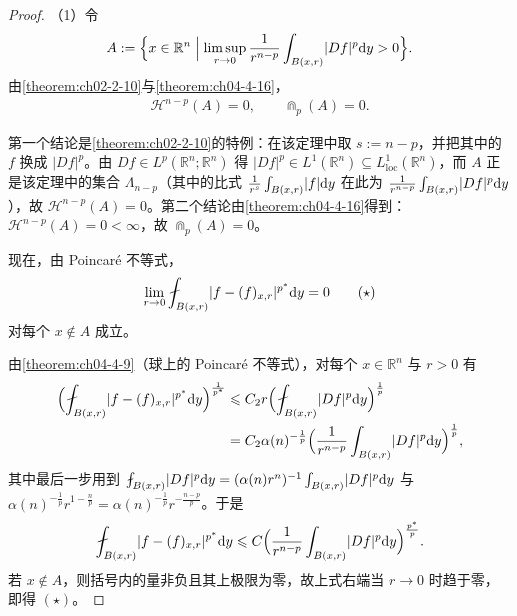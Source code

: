 \documentclass[../../main.tex]{subfiles}%
\begin{document}
\begin{proof}
（1）令
\begin{align*}
A:=\Bigl\{x\in\mathbb{R}^n\Bigm|\limsup_{r\to0}\frac{1}{r^{n-p}}\int_{B(x,r)}\lvert Df\rvert^p\mathrm{d} y>0\Bigr\} .
\end{align*}
由\cref{theorem:ch02-2-10}与\cref{theorem:ch04-4-16}，%
\begin{align*}
\mathcal{H}^{n-p}(A)=0,\qquad\Cap_p(A)=0 .
\end{align*}

第一个结论是\cref{theorem:ch02-2-10}的特例：在该定理中取 $s:=n-p$，并把其中的 $f$ 换成 $\lvert Df\rvert^p$。由 $Df\in L^p(\mathbb{R}^n;\mathbb{R}^n)$ 得 $\lvert Df\rvert^p\in L^1(\mathbb{R}^n)\subseteq L^1_{\mathrm{loc}}(\mathbb{R}^n)$，而 $A$ 正是该定理中的集合 $\Lambda_{n-p}$（其中的比式 $\frac{1}{r^s}\int_{B(x,r)}\lvert f\rvert\mathrm{d} y$ 在此为 $\frac{1}{r^{n-p}}\int_{B(x,r)}\lvert Df\rvert^p\mathrm{d} y$），故 $\mathcal{H}^{n-p}(A)=0$。第二个结论由\cref{theorem:ch04-4-16}得到：$\mathcal{H}^{n-p}(A)=0<\infty$，故 $\Cap_p(A)=0$。%

现在，由 Poincaré 不等式，
\begin{align*}
\lim_{r\to0}\fint_{B(x,r)}\lvert f-(f)_{x,r}\rvert^{p^*}\diff y=0\qquad(\star)
\end{align*}
对每个 $x\notin A$ 成立。

由\cref{theorem:ch04-4-9}（球上的 Poincaré 不等式），对每个 $x\in\mathbb{R}^n$ 与 $r>0$ 有 %
\begin{align*}
\Bigl(\fint_{B(x,r)}\lvert f-(f)_{x,r}\rvert^{p^*}\diff y\Bigr)^{\frac{1}{p^*}}
&\leqslant C_2r\Bigl(\fint_{B(x,r)}\lvert Df\rvert^p\diff y\Bigr)^{\frac{1}{p}}\\
&=C_2\alpha(n)^{-\frac{1}{p}}\Bigl(\frac{1}{r^{n-p}}\int_{B(x,r)}\lvert Df\rvert^p\diff y\Bigr)^{\frac{1}{p}} ,%
\end{align*}
其中最后一步用到 $\fint_{B(x,r)}\lvert Df\rvert^p\diff y=(\alpha(n)r^n)^{-1}\int_{B(x,r)}\lvert Df\rvert^p\diff y$ 与 $\alpha(n)^{-\frac{1}{p}}r^{1-\frac{n}{p}}=\alpha(n)^{-\frac{1}{p}}r^{-\frac{n-p}{p}}$。于是
\begin{align*}
\fint_{B(x,r)}\lvert f-(f)_{x,r}\rvert^{p^*}\diff y\leqslant C\Bigl(\frac{1}{r^{n-p}}\int_{B(x,r)}\lvert Df\rvert^p\diff y\Bigr)^{\frac{p^*}{p}} .
\end{align*}
若 $x\notin A$，则括号内的量非负且其上极限为零，故上式右端当 $r\to0$ 时趋于零，即得 $(\star)$。


\end{proof}
\end{document}
